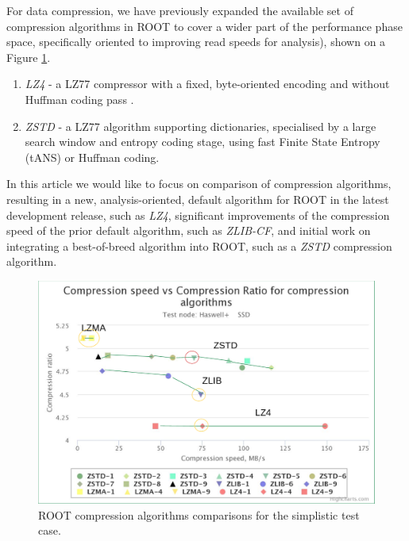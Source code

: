 \documentclass[12pt]{iopart}
\begin{document}

For data compression, we have previously expanded the available set of compression algorithms in ROOT to cover a wider part of the performance phase space, specifically oriented to improving read speeds for analysis), shown on a Figure \ref{fig:compression}.
\begin{enumerate}
    \item \textit{LZ4} - a LZ77 compressor with a fixed, byte-oriented encoding and without Huffman coding pass \cite{lz4} \cite{brianzhe}.
    \item \textit{ZSTD} - a LZ77 algorithm supporting dictionaries, specialised by a large search window and entropy coding stage, using fast Finite State Entropy (tANS) or Huffman coding.\cite{zstd}
\end{enumerate}

In this article we would like to focus on comparison of compression algorithms, resulting in a new, analysis-oriented, default algorithm for ROOT in the latest development release, such as \textit{LZ4}, significant improvements of the compression speed of the prior default algorithm, such as \textit{ZLIB-CF}, and initial work on integrating a best-of-breed algorithm into ROOT, such as a \textit{ZSTD} compression algorithm.

\begin{figure}[h]
\centering
\includegraphics[width=0.8\linewidth]{compr.png}
\caption{ROOT compression algorithms comparisons for the  simplistic test case.}
\label{fig:compression}
\end{figure}
\end{document}
